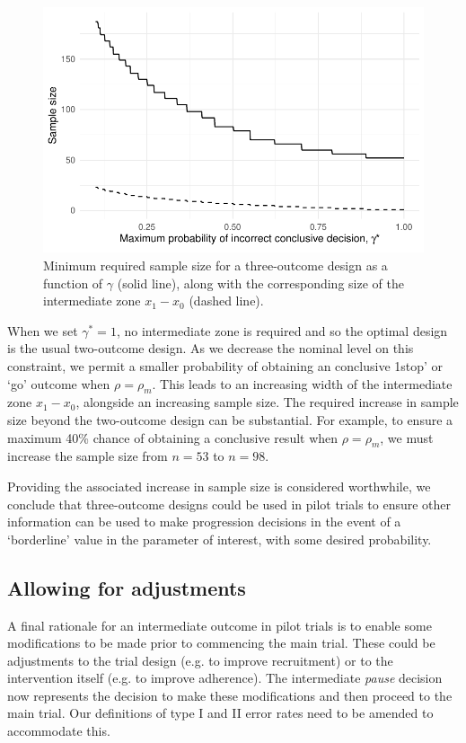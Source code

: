 \documentclass{bmcart}
\begin{document}
\begin{figure}
\centering
\includegraphics[scale=0.8]{./figures/gamma_ns}
\caption{Minimum required sample size for a three-outcome design as a function of $\gamma$ (solid line), along with the corresponding size of the intermediate zone $x_1 - x_0$ (dashed line).}
\label{fig:gamma_ns}
\end{figure}

When we set $\gamma^* = 1$, no intermediate zone is required and so the optimal design is the usual two-outcome design. As we decrease the nominal level on this constraint, we permit a smaller probability of obtaining an conclusive 1stop' or `go' outcome when $\rho = \rho_m$. This leads to an increasing width of the intermediate zone $x_1 - x_0$, alongside an increasing sample size. The required increase in sample size beyond the two-outcome design can be substantial. For example, to ensure a maximum 40\% chance of obtaining a conclusive result when $\rho = \rho_m$, we must increase the sample size from $n = 53$ to $n = 98$. 

Providing the associated increase in sample size is considered worthwhile, we conclude that three-outcome designs could be used in pilot trials to ensure other information can be used to make progression decisions in the event of a `borderline' value in the parameter of interest, with some desired probability.

\subsection{Allowing for adjustments}

A final rationale for an intermediate outcome in pilot trials is to enable some modifications to be made prior to commencing the main trial. These could be adjustments to the trial design (e.g. to improve recruitment) or to the intervention itself (e.g. to improve adherence). The intermediate \emph{pause} decision now represents the decision to make these modifications and then proceed to the main trial. Our definitions of type I and II error rates need to be amended to accommodate this.
\end{document}
